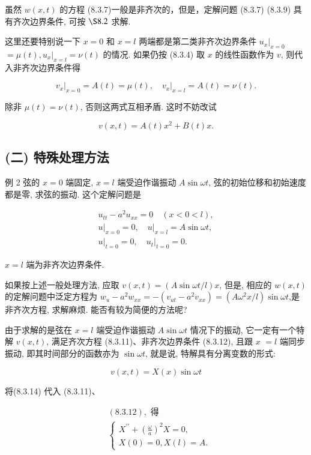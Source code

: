虽然 $w(x, t)$ 的方程 (8.3.7)一般是非齐次的，但是，定解问题 (8.3.7) (8.3.9) 具有齐次边界条件, 可按 $\S 8.2$ 求解.

这里还要特别说一下 $x=0$ 和 $x=l$ 两端都是第二类非齐次边界条件 $\left.u_{x}\right|_{x=0}$ $=\mu(t),\left.u_{x}\right|_{x=l}=\nu(t)$ 的情况. 如果仍按 (8.3.4) 取 $x$ 的线性函数作为 $v$, 则代入非齐次边界条件得

$$
\left.v_{x}\right|_{x=0}=A(t)=\mu(t),\left.\quad v_{x}\right|_{x=l}=A(t)=\nu(t) .
$$

除非 $\mu(t)=\nu(t)$, 否则这两式互相矛盾. 这时不妨改试

$$
v(x, t)=A(t) x^{2}+B(t) x .
$$

\subsection{(二) 特殊处理方法}
例 2 弦的 $x=0$ 端固定, $x=l$ 端受迫作谐振动 $A \sin \omega t$, 弦的初始位移和初始速度都是零, 求弦的振动. 这个定解问题是

$$
\begin{gathered}
u_{t t}-a^{2} u_{x x}=0 \quad(x<0<l), \\
\left.u\right|_{x=0}=0,\left.\quad u\right|_{x=l}=A \sin \omega t, \\
\left.u\right|_{t=0}=0,\left.\quad u_{t}\right|_{t=0}=0 .
\end{gathered}
$$

$x=l$ 端为非齐次边界条件.

如果按上述一般处理方法, 应取 $v(x, t)=(A \sin \omega t / l) x$, 但是, 相应的 $w(x, t)$ 的定解问题中泛定方程为 $w_{u}-a^{2} w_{x x}=-\left(v_{u t}-a^{2} v_{x x}\right)=\left(A \omega^{2} x / l\right) \sin \omega t$,是非齐次方程, 求解麻烦. 能否有较为简便的方法呢?

由于求解的是弦在 $x=l$ 端受迫作谐振动 $A \sin \omega t$ 情况下的振动, 它一定有一个特解 $v(x, t)$, 满足齐次方程 (8.3.11)、非齐次边界条件 (8.3.12), 且跟 $x$
$=l$ 端同步振动, 即其时间部分的函数亦为 $\sin \omega t$, 就是说, 特解具有分离变数的形式:

$$
v(x, t)=X(x) \sin \omega t
$$

将(8.3.14) 代入 (8.3.11)、

$$
\begin{aligned}
& (8.3 .12), \text { 得 } \\
& \left\{\begin{array}{l}
X^{\prime \prime}+\left(\frac{\omega}{a}\right)^{2} X=0, \\
X(0)=0, X(l)=A .
\end{array}\right.
\end{aligned}
$$

